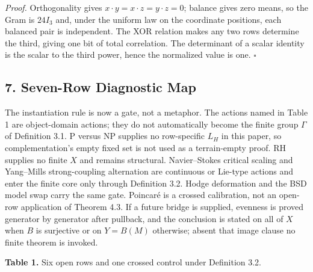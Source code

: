 \documentclass[10pt,twocolumn]{article}
\begin{document}
\emph{Proof.} Orthogonality gives
\(x \cdot y = x \cdot z = y \cdot z = 0\); balance gives zero means, so
the Gram is \(24 I_3\) and, under the uniform law on the coordinate
positions, each balanced pair is independent. The XOR relation makes any
two rows determine the third, giving one bit of total correlation. The
determinant of a scalar identity is the scalar to the third power, hence
the normalized value is one. \(\square\)

\subsection{7. Seven-Row Diagnostic Map}\label{seven-row-diagnostic-map}

The instantiation rule is now a gate, not a metaphor. The actions named
in Table 1 are object-domain actions; they do not automatically become
the finite group \(\Gamma\) of Definition 3.1. P versus NP supplies no
row-specific \(L_H\) in this paper, so complementation's empty fixed set
is not used as a terrain-empty proof. RH supplies no finite \(X\) and
remains structural. Navier--Stokes critical scaling and Yang--Mills
strong-coupling alternation are continuous or Lie-type actions and enter
the finite core only through Definition 3.2. Hodge deformation and the
BSD model swap carry the same gate. Poincaré is a crossed calibration,
not an open-row application of Theorem 4.3. If a future bridge is
supplied, evenness is proved generator by generator after pullback, and
the conclusion is stated on all of \(X\) when \(B\) is surjective or on
\(Y = B(M)\) otherwise; absent that image clause no finite theorem is
invoked.

\textbf{Table 1.} Six open rows and one crossed control under Definition
3.2.
\end{document}
